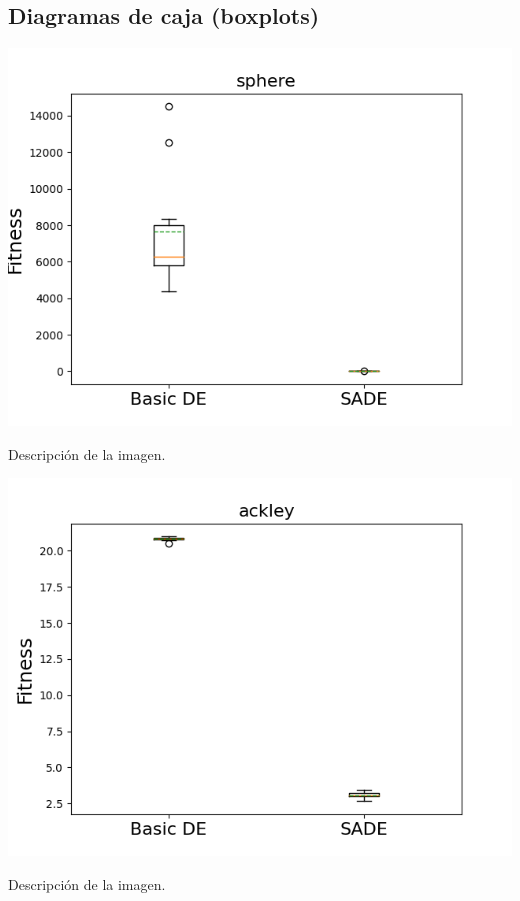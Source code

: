 \documentclass[11pt, a4paper, titlepage]{article}
\begin{document}
\subsection{Diagramas de caja (boxplots)}
\begin{center}
\includegraphics[scale=0.85]{sphere}
\end{center}
Descripción de la imagen.
\begin{center}
\includegraphics[scale=0.85]{ackley}
\end{center}
Descripción de la imagen.
\end{document}
